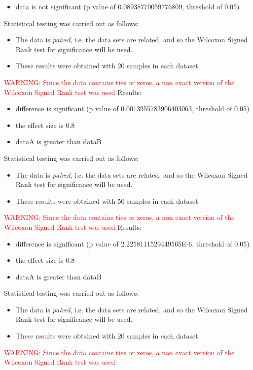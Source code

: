 \documentclass[]{article}
\begin{document}
\begin{itemize}
\item{data is not significant (p value of 0.08938770059776809, threshold of 0.05)}
\end{itemize}Statistical testing was carried out as follows: \begin{itemize}
\item{The data is \textit{paired}, i.e. the data sets are related, and so the Wilcoxon Signed Rank test for significance will be used.}
\item{These results were obtained with 20 samples in each dataset}
\end{itemize}
\textcolor{Red}{WARNING: Since the data contains ties or zeros, a non exact version of the Wilcoxon Signed Rank test was used
}
Results:
\begin{itemize}
\item{difference is significant (p value of 0.0013955783906403063, threshold of 0.05)}
\item{the effect size is 0.8}
\item{dataA is greater than dataB}
\end{itemize}Statistical testing was carried out as follows: \begin{itemize}
\item{The data is \textit{paired}, i.e. the data sets are related, and so the Wilcoxon Signed Rank test for significance will be used.}
\item{These results were obtained with 50 samples in each dataset}
\end{itemize}
\textcolor{Red}{WARNING: Since the data contains ties or zeros, a non exact version of the Wilcoxon Signed Rank test was used
}
Results:
\begin{itemize}
\item{difference is significant (p value of 2.2258111529449565E-6, threshold of 0.05)}
\item{the effect size is 0.8}
\item{dataA is greater than dataB}
\end{itemize}Statistical testing was carried out as follows: \begin{itemize}
\item{The data is \textit{paired}, i.e. the data sets are related, and so the Wilcoxon Signed Rank test for significance will be used.}
\item{These results were obtained with 20 samples in each dataset}
\end{itemize}
\textcolor{Red}{WARNING: Since the data contains ties or zeros, a non exact version of the Wilcoxon Signed Rank test was used
}
\end{document}
